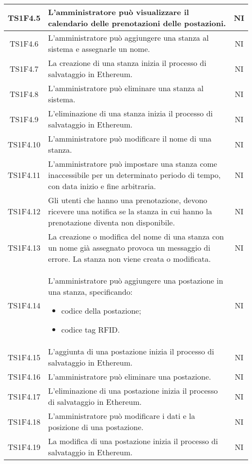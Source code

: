 \begin{center}
\begin{longtable}{|c|p{10cm}|c|}
			\hline
			TS1F4.5 & L'amministratore può visualizzare il calendario delle prenotazioni delle postazioni. & NI \\			
			\hline
			TS1F4.6 & L'amministratore può aggiungere una stanza al sistema e assegnarle un nome. & NI \\			
			\hline
			TS1F4.7 & La creazione di una stanza inizia il processo di salvataggio in Ethereum. & NI \\			
			\hline
			TS1F4.8 & L'amministratore può eliminare una stanza al sistema. & NI \\			
			\hline
			TS1F4.9 & L'eliminazione di una stanza inizia il processo di salvataggio in Ethereum. & NI \\			
			\hline
			TS1F4.10 & L'amministratore può modificare il nome di una stanza. & NI \\			
			\hline
			TS1F4.11 & L'amministratore può impostare una stanza come inaccessibile per un determinato periodo di tempo, con data inizio e fine arbitraria. & NI \\			
			\hline
			TS1F4.12 & Gli utenti che hanno una prenotazione, devono ricevere una notifica se la stanza in cui hanno la prenotazione diventa non disponibile. & NI \\			
			\hline
			TS1F4.13 & La creazione o modifica del nome di una stanza con un nome già assegnato provoca un messaggio di errore. La stanza non viene creata o modificata. & NI \\			
			\hline
			TS1F4.14 & L'amministratore può aggiungere una postazione in una stanza, specificando:
			\begin{itemize}
				\item codice della postazione;
				\item codice tag RFID.
			\end{itemize}
			& NI \\			
			\hline			
			TS1F4.15 & L'aggiunta di una postazione inizia il processo di salvataggio in Ethereum. & NI \\			
			\hline		
			TS1F4.16 & L'amministratore può eliminare una postazione. & NI \\			
			\hline		
			TS1F4.17 & L'eliminazione di una postazione inizia il processo di salvataggio in Ethereum. & NI \\			
			\hline	
			TS1F4.18 & L'amministratore può modificare i dati e la posizione di una postazione. & NI \\			
			\hline	
			TS1F4.19 & La modifica di una postazione inizia il processo di salvataggio in Ethereum. & NI \\			

\end{longtable}
\end{center}
